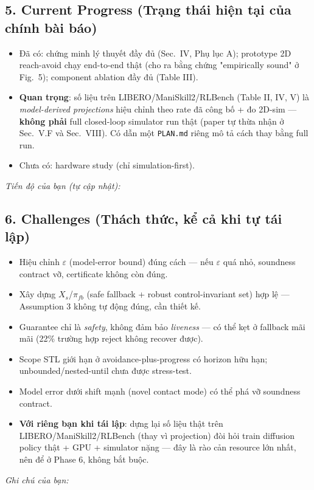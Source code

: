 \documentclass[a4paper,12pt]{article}
\begin{document}
\subsection*{5. Current Progress (Trạng thái hiện tại của chính bài báo)}
\begin{itemize}
  \item Đã có: chứng minh lý thuyết đầy đủ (Sec.~IV, Phụ lục A); prototype 2D reach-avoid chạy end-to-end thật (cho ra bằng chứng "empirically sound" ở Fig.~5); component ablation đầy đủ (Table III).
  \item \textbf{Quan trọng}: số liệu trên LIBERO/ManiSkill2/RLBench (Table II, IV, V) là \emph{model-derived projections} hiệu chỉnh theo rate đã công bố + đo 2D-sim — \textbf{không phải} full closed-loop simulator run thật (paper tự thừa nhận ở Sec.~V.F và Sec.~VIII). Có dẫn một \texttt{PLAN.md} riêng mô tả cách thay bằng full run.
  \item Chưa có: hardware study (chỉ simulation-first).
\end{itemize}
\begin{tasklist}
  \item[\square] \textit{Tiến độ của bạn (tự cập nhật):} \underline{\hspace{10cm}}
\end{tasklist}

\subsection*{6. Challenges (Thách thức, kể cả khi tự tái lập)}
\begin{itemize}
  \item Hiệu chỉnh $\varepsilon$ (model-error bound) đúng cách — nếu $\varepsilon$ quá nhỏ, soundness contract vỡ, certificate không còn đúng.
  \item Xây dựng $X_s$/$\pi_{fb}$ (safe fallback + robust control-invariant set) hợp lệ — Assumption 3 không tự động đúng, cần thiết kế.
  \item Guarantee chỉ là \emph{safety}, không đảm bảo \emph{liveness} — có thể kẹt ở fallback mãi mãi (22\% trường hợp reject không recover được).
  \item Scope STL giới hạn ở avoidance-plus-progress có horizon hữu hạn; unbounded/nested-until chưa được stress-test.
  \item Model error dưới shift mạnh (novel contact mode) có thể phá vỡ soundness contract.
  \item \textbf{Với riêng bạn khi tái lập}: dựng lại số liệu thật trên LIBERO/ManiSkill2/RLBench (thay vì projection) đòi hỏi train diffusion policy thật + GPU + simulator nặng — đây là rào cản resource lớn nhất, nên để ở Phase 6, không bắt buộc.
\end{itemize}
\begin{tasklist}
  \item[\square] \textit{Ghi chú của bạn:} \underline{\hspace{10cm}}
\end{tasklist}
\end{document}
